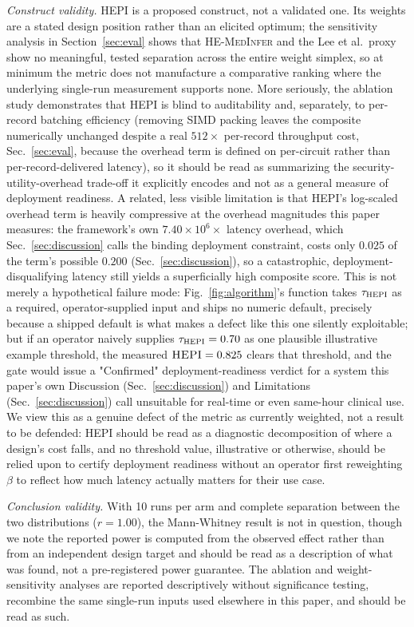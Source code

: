 \documentclass[journal,compsoc]{IEEEtran}
\newcommand{\HEPI}{\textsc{HEPI}}          %
\newcommand{\framework}{\textsc{HE-MedInfer}}
\begin{document}
\textit{Construct validity.} \HEPI{} is a proposed construct, not a validated
one. Its weights are a stated design position rather than an elicited optimum;
the sensitivity analysis in Section~\ref{sec:eval} shows that \framework{}
and the Lee et al.\ proxy show no meaningful, tested separation across the
entire weight simplex, so at minimum the metric does not manufacture a
comparative ranking where the underlying single-run measurement supports
none. More seriously, the ablation study demonstrates that \HEPI{} is blind to
auditability and, separately, to per-record batching efficiency (removing
SIMD packing leaves the composite numerically unchanged despite a real
$512\times$ per-record throughput cost, Sec.~\ref{sec:eval}, because the
overhead term is defined on per-circuit rather than per-record-delivered
latency), so it should be read as summarizing the security-utility-overhead
trade-off it explicitly encodes and not as a general measure of deployment
readiness. A related, less visible limitation is that \HEPI{}'s log-scaled
overhead term is heavily compressive at the overhead magnitudes this paper
measures: the framework's own $7.40 \times 10^6\times$ latency overhead,
which Sec.~\ref{sec:discussion} calls the binding deployment constraint,
costs only $0.025$ of the term's possible $0.200$ (Sec.~\ref{sec:discussion}),
so a catastrophic, deployment-disqualifying latency still yields a
superficially high composite score. This is not merely a hypothetical
failure mode: Fig.~\ref{fig:algorithm}'s \FVerify{} function takes
$\tau_{\HEPI}$ as a required, operator-supplied input and ships no numeric
default, precisely because a shipped default is what makes a defect like
this one silently exploitable; but if an operator naively supplies
$\tau_{\HEPI} = 0.70$ as one plausible illustrative example threshold, the
measured $\HEPI = 0.825$ clears that
threshold, and the gate would issue a "Confirmed" deployment-readiness
verdict for a system this paper's own Discussion (Sec.~\ref{sec:discussion})
and Limitations (Sec.~\ref{sec:discussion}) call unsuitable for real-time or
even same-hour clinical use. We view this as a genuine defect of the metric
as currently weighted, not a result to be defended: \HEPI{}
should be read as a diagnostic decomposition of where a design's cost falls,
and no threshold value, illustrative or otherwise, should be relied upon to
certify deployment readiness without an operator first reweighting $\beta$
to reflect how much latency actually matters for their use case.

\textit{Conclusion validity.} With 10 runs per arm and complete separation
between the two distributions ($r = 1.00$), the Mann-Whitney result is not in
question, though we note the reported power is computed from the observed
effect rather than from an independent design target and should be read as a
description of what was found, not a pre-registered power guarantee. The
ablation and weight-sensitivity analyses are reported descriptively without
significance testing, recombine the same single-run inputs used elsewhere in
this paper, and should be read as such.
\end{document}
